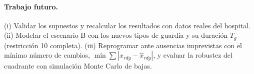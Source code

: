 \paragraph{Trabajo futuro.} (i) Validar los supuestos y recalcular los resultados con datos reales del hospital. (ii) Modelar el escenario B con los nuevos tipos de guardia y su duración $T_g$ (restricción 10 completa). (iii) Reprogramar ante ausencias imprevistas con el mínimo número de cambios, $\min \sum |x_{rdg} - \hat x_{rdg}|$, y evaluar la robustez del cuadrante con simulación Monte Carlo de bajas.

